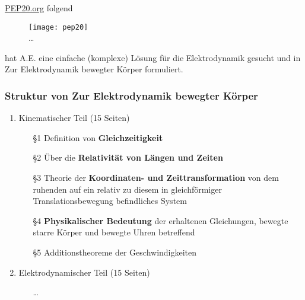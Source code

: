 \documentclass[]{beamer}%
\begin{document}
\begin{frame}
	\href{https://pep20.org/}{PEP20.org} folgend 
    \begin{figure}[h]
            \centering
            \texttt{[image: pep20]}\\
            \dots
    \end{figure}
    hat A.E. eine einfache (komplexe) 
    Lösung für die Elektrodynamik gesucht und in
    \glqq Zur Elektrodynamik bewegter Körper\grqq{} formuliert.
\end{frame}

\begin{frame}
    \frametitle{Struktur von \glqq{} Zur Elektrodynamik bewegter Körper \grqq{}}
    \begin{enumerate}[I]
        \item Kinematischer Teil (15 Seiten)
        \begin{itemize}
			\item[§1]   Definition von \textbf{Gleichzeitigkeit}
			\item[§2]   Über die \textbf{Relativität von Längen und Zeiten}
			\item[§3]   Theorie der \textbf{Koordinaten- und Zeittransformation} von dem ruhenden
                        auf ein relativ zu diesem in gleichförmiger Translationsbewegung 
                        befindliches System
			\item[§4]   \textbf{Physikalischer Bedeutung} der erhaltenen Gleichungen, 
                        bewegte starre Körper und bewegte Uhren betreffend
			\item[§5]   Additionstheoreme der Geschwindigkeiten
		\end{itemize}
        \vspace{10pt}
		\item Elektrodynamischer Teil (15 Seiten)
        \begin{itemize}
            \item[]\dots
        \end{itemize}
	\end{enumerate}
\end{frame}
\end{document}
